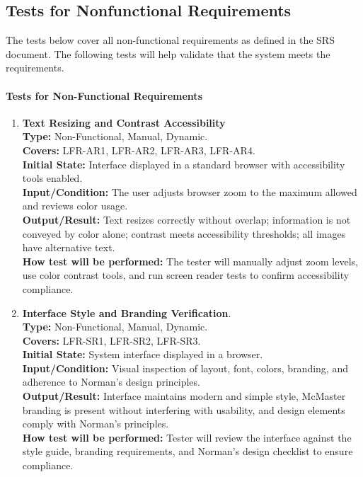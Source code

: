\documentclass[12pt, titlepage]{article}
\begin{document}
\subsection{Tests for Nonfunctional Requirements}

The tests below cover all non-functional requirements as defined in
the SRS document. The following tests will help validate that the system meets 
the requirements. 

\paragraph{Tests for Non-Functional Requirements}

\begin{enumerate}[label=NFR-ST \arabic*., wide=0pt, leftmargin=*]

  \item{}
    \textbf{Text Resizing and Contrast Accessibility} \\[2mm]
    \textbf{Type:} Non-Functional, Manual, Dynamic. \\
    \textbf{Covers:} LFR-AR1, LFR-AR2, LFR-AR3, LFR-AR4. \\
    \textbf{Initial State:} Interface displayed in a standard browser
    with accessibility tools enabled. \\
    \textbf{Input/Condition:} The user adjusts browser zoom to the
    maximum allowed and reviews color usage. \\
    \textbf{Output/Result:} Text resizes correctly without overlap;
    information is not conveyed by color alone; contrast meets
    accessibility thresholds; all images have alternative text. \\[2mm]
    \textbf{How test will be performed:} The tester will manually
    adjust zoom levels, use color contrast tools, and run screen
    reader tests to confirm accessibility compliance.

  \item \textbf{Interface Style and Branding Verification}. \\[2mm]
    \textbf{Type:} Non-Functional, Manual, Dynamic. \\
    \textbf{Covers:} LFR-SR1, LFR-SR2, LFR-SR3. \\
    \textbf{Initial State:} System interface displayed in a browser. \\
    \textbf{Input/Condition:} Visual inspection of layout, font,
    colors, branding, and adherence to Norman's design principles. \\
    \textbf{Output/Result:} Interface maintains modern and simple
    style, McMaster branding is present without interfering with
    usability, and design elements comply with Norman’s principles. \\[2mm]
    \textbf{How test will be performed:} Tester will review the
    interface against the style guide, branding requirements, and
    Norman’s design checklist to ensure compliance.


\end{enumerate}
\end{document}
